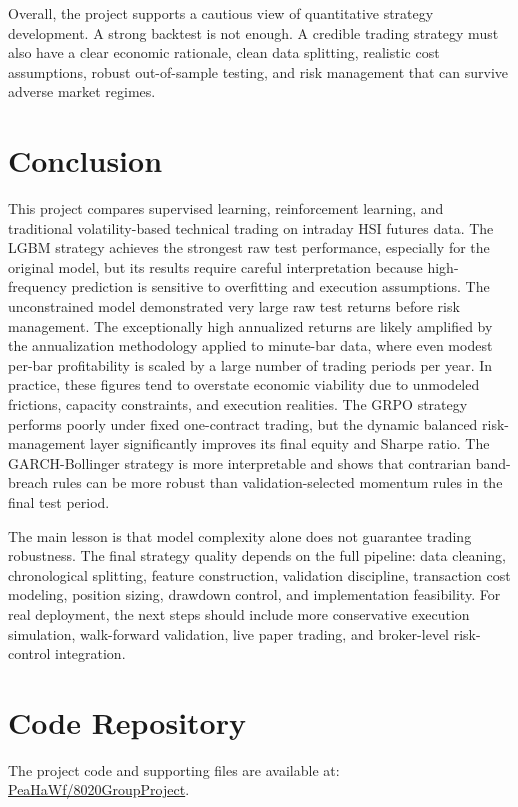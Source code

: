 \documentclass[11pt,a4paper]{article}
\begin{document}
Overall, the project supports a cautious view of quantitative strategy development. A strong backtest is not enough. A credible trading strategy must also have a clear economic rationale, clean data splitting, realistic cost assumptions, robust out-of-sample testing, and risk management that can survive adverse market regimes.

\section{Conclusion}

This project compares supervised learning, reinforcement learning, and traditional volatility-based technical trading on intraday HSI futures data. The LGBM strategy achieves the strongest raw test performance, especially for the original model, but its results require careful interpretation because high-frequency prediction is sensitive to overfitting and execution assumptions. The unconstrained model demonstrated very large raw test returns before risk management. The exceptionally high annualized returns are likely amplified by the annualization methodology applied to minute-bar data, where even modest per-bar profitability is scaled by a large number of trading periods per year. In practice, these figures tend to overstate economic viability due to unmodeled frictions, capacity constraints, and execution realities. The GRPO strategy performs poorly under fixed one-contract trading, but the dynamic balanced risk-management layer significantly improves its final equity and Sharpe ratio. The GARCH-Bollinger strategy is more interpretable and shows that contrarian band-breach rules can be more robust than validation-selected momentum rules in the final test period.

The main lesson is that model complexity alone does not guarantee trading robustness. The final strategy quality depends on the full pipeline: data cleaning, chronological splitting, feature construction, validation discipline, transaction cost modeling, position sizing, drawdown control, and implementation feasibility. For real deployment, the next steps should include more conservative execution simulation, walk-forward validation, live paper trading, and broker-level risk-control integration.

\section{Code Repository}

The project code and supporting files are available at: \href{https://github.com/PeaHaWf/8020GroupProject}{PeaHaWf/8020GroupProject}.
\end{document}
